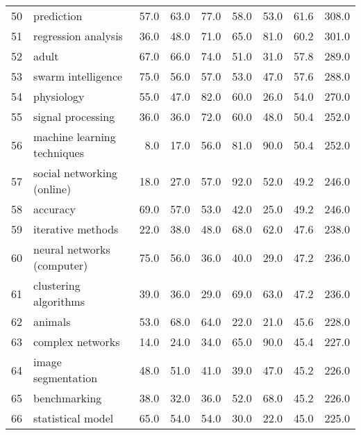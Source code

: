 \begin{tabular}{llrrrrrrr}
50 &                               prediction &    57.0 &    63.0 &    77.0 &    58.0 &    53.0 &    61.6 &   308.0 \\
51 &                      regression analysis &    36.0 &    48.0 &    71.0 &    65.0 &    81.0 &    60.2 &   301.0 \\
52 &                                    adult &    67.0 &    66.0 &    74.0 &    51.0 &    31.0 &    57.8 &   289.0 \\
53 &                       swarm intelligence &    75.0 &    56.0 &    57.0 &    53.0 &    47.0 &    57.6 &   288.0 \\
54 &                               physiology &    55.0 &    47.0 &    82.0 &    60.0 &    26.0 &    54.0 &   270.0 \\
55 &                        signal processing &    36.0 &    36.0 &    72.0 &    60.0 &    48.0 &    50.4 &   252.0 \\
56 &              machine learning techniques &     8.0 &    17.0 &    56.0 &    81.0 &    90.0 &    50.4 &   252.0 \\
57 &               social networking (online) &    18.0 &    27.0 &    57.0 &    92.0 &    52.0 &    49.2 &   246.0 \\
58 &                                 accuracy &    69.0 &    57.0 &    53.0 &    42.0 &    25.0 &    49.2 &   246.0 \\
59 &                        iterative methods &    22.0 &    38.0 &    48.0 &    68.0 &    62.0 &    47.6 &   238.0 \\
60 &               neural networks (computer) &    75.0 &    56.0 &    36.0 &    40.0 &    29.0 &    47.2 &   236.0 \\
61 &                    clustering algorithms &    39.0 &    36.0 &    29.0 &    69.0 &    63.0 &    47.2 &   236.0 \\
62 &                                  animals &    53.0 &    68.0 &    64.0 &    22.0 &    21.0 &    45.6 &   228.0 \\
63 &                         complex networks &    14.0 &    24.0 &    34.0 &    65.0 &    90.0 &    45.4 &   227.0 \\
64 &                       image segmentation &    48.0 &    51.0 &    41.0 &    39.0 &    47.0 &    45.2 &   226.0 \\
65 &                             benchmarking &    38.0 &    32.0 &    36.0 &    52.0 &    68.0 &    45.2 &   226.0 \\
66 &                        statistical model &    65.0 &    54.0 &    54.0 &    30.0 &    22.0 &    45.0 &   225.0 \\

\end{tabular}
